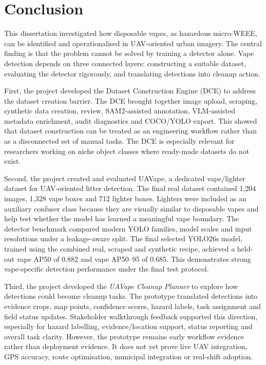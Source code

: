 \section{Conclusion}

This dissertation investigated how disposable vapes, as hazardous micro-WEEE, can be identified and operationalised in UAV-oriented urban imagery. The central finding is that the problem cannot be solved by training a detector alone. Vape detection depends on three connected layers: constructing a suitable dataset, evaluating the detector rigorously, and translating detections into cleanup action.

First, the project developed the Dataset Construction Engine (DCE) to address the dataset creation barrier. The DCE brought together image upload, scraping, synthetic data creation, review, SAM2-assisted annotation, VLM-assisted metadata enrichment, audit diagnostics and COCO/YOLO export. This showed that dataset construction can be treated as an engineering workflow rather than as a disconnected set of manual tasks. The DCE is especially relevant for researchers working on niche object classes where ready-made datasets do not exist.

Second, the project created and evaluated UAVape, a dedicated vape/lighter dataset for UAV-oriented litter detection. The final real dataset contained 1,204 images, 1,328 vape boxes and 712 lighter boxes. Lighters were included as an auxiliary confuser class because they are visually similar to disposable vapes and help test whether the model has learned a meaningful vape boundary. The detector benchmark compared modern YOLO families, model scales and input resolutions under a leakage-aware split. The final selected YOLO26s model, trained using the combined real, scraped and synthetic recipe, achieved a held-out vape AP50 of 0.882 and vape AP50--95 of 0.685. This demonstrates strong vape-specific detection performance under the final test protocol.

Third, the project developed the \textit{UAVape Cleanup Planner} to explore how detections could become cleanup tasks. The prototype translated detections into evidence crops, map points, confidence scores, hazard labels, task assignment and field status updates. Stakeholder walkthrough feedback supported this direction, especially for hazard labelling, evidence/location support, status reporting and overall task clarity. However, the prototype remains early workflow evidence rather than deployment evidence. It does not yet prove live UAV integration, GPS accuracy, route optimisation, municipal integration or real-shift adoption.


